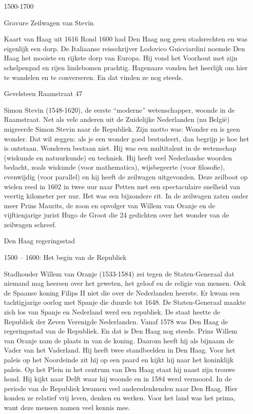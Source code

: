 \documentclass[
  a4paper,
]{book}
\begin{document}
1500-1700

Gravure Zeilwagen van Stevin

Kaart van Haag uit 1616
Rond 1600 had Den Haag nog geen stadsrechten en was eigenlijk een dorp. De Italiaanse reisschrijver Lodovico Guicciardini noemde Den Haag het mooiste en rijkste dorp van Europa. Hij vond het Voorhout met zijn schelpenpad en rijen lindebomen prachtig. Hagenaars vonden het heerlijk om hier te wandelen en te converseren. En dat vinden ze nog steeds.

Gevelsteen Raamstraat 47

Simon Stevin (1548-1620), de eerste ``moderne'' wetenschapper, woonde in de Raamstraat. Net als vele anderen uit de Zuidelijke Nederlanden (nu België) migreerde Simon Stevin naar de Republiek. Zijn motto was: Wonder en is geen wonder. Dat wil zeggen: als je een wonder goed bestudeert, dan begrijp je hoe het is ontstaan. Wonderen bestaan niet. Hij was een multitalent in de wetenschap (wiskunde en natuurkunde) en techniek. Hij heeft veel Nederlandse woorden bedacht, zoals wiskunde (voor mathematica), wijsbegeerte (voor filosofie), evenwijdig (voor parallel) en hij heeft de zeilwagen uitgevonden. Deze zeilboot op wielen reed in 1602 in twee uur naar Petten met een spectaculaire snelheid van veertig kilometer per uur. Het was een bijzondere rit. In de zeilwagen zaten onder meer Prins Maurits, de zoon en opvolger van Willem van Oranje en de vijftienjarige jurist Hugo de Groot die 24 gedichten over het wonder van de zeilwagen schreef.

Den Haag regeringsstad

1500 -- 1600: Het begin van de Republiek

Stadhouder Willem van Oranje (1533-1584) zei tegen de Staten-Generaal dat niemand mag heersen over het geweten, het geloof en de religie van mensen.
Ook de Spaanse koning Filips II niet die over de Nederlanden heerste.
Er kwam een tachtigjarige oorlog met Spanje die duurde tot 1648.
De Staten-Generaal maakte zich los van Spanje en Nederland werd een republiek.
De staat heette de Republiek der Zeven Verenigde Nederlanden.
Vanaf 1578 was Den Haag de regeringsstad van de Republiek.
En dat is Den Haag nog steeds.
Prins Willem van Oranje nam de plaats in van de koning.
Daarom heeft hij als bijnaam de Vader van het Vaderland.
Hij heeft twee standbeelden in Den Haag.
Voor het paleis op het Noordeinde zit hij op een paard en kijkt hij naar het koninklijk paleis.
Op het Plein in het centrum van Den Haag staat hij naast zijn trouwe hond.
Hij kijkt naar Delft waar hij woonde en in 1584 werd vermoord.
In de periode van de Republiek kwamen veel andersdenkenden naar Den Haag.
Hier konden ze relatief vrij leven, denken en werken.
Voor het land was het prima, want deze mensen namen veel kennis mee.
\end{document}
